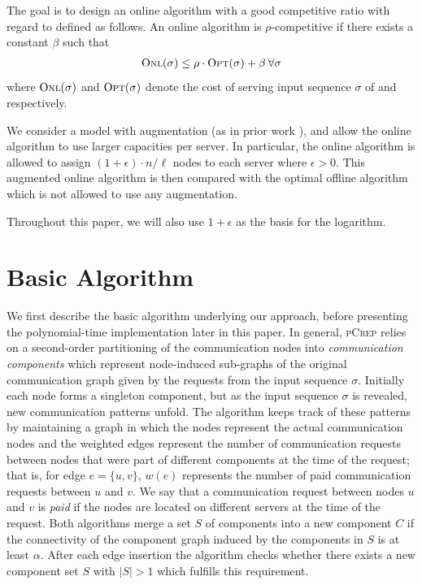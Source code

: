 \documentclass[a4paper,UKenglish,cleveref, autoref, thm-restate,authorcolumns]{lipics-v2019}
\newcommand{\adjDel}{\textsc{pCrep}}
\newcommand{\opt}{\text{O{\scriptsize PT}}}
\newcommand{\onl}{\text{O{\scriptsize NL}}}
\begin{document}
The goal is to design an online algorithm \onl{} with a good competitive ratio with regard to \opt{} defined as follows.
An online algorithm \onl{} is $\rho$-competitive if there exists a constant $\beta$ such that 
\begin{align*}
\onl{}(\sigma)\leq\rho\cdot \opt{}(\sigma)+\beta\:\forall \sigma
\end{align*} 
where $\onl{}(\sigma)$ and $\opt{}(\sigma)$ denote the cost of serving input sequence $\sigma$ of \onl{} and \opt{} respectively.

We consider a model with augmentation (as in prior work \cite{Avin2016}),
and allow the online algorithm to use larger capacities per server. 
In particular, the online algorithm is allowed to assign $(1+\epsilon)\cdot n/\ell$ nodes to each server where $\epsilon>0$. 
This augmented online algorithm is then compared with the optimal offline algorithm \opt{} which is not allowed to use any augmentation.

Throughout this paper, 
we will also use $1+\epsilon$ as the basis for the logarithm.

\section{Basic Algorithm}
\label{algIdeas}

We first describe the basic algorithm underlying
our approach, before presenting the polynomial-time implementation
later in this paper.
In general, \adjDel{} relies on a second-order partitioning of the communication nodes into \textit{communication components} which represent node-induced sub-graphs of the original communication graph given by the requests from the input sequence $\sigma$. 
Initially each node forms a singleton component, but as the input sequence $\sigma$ is revealed, new communication patterns unfold. The algorithm keeps track of these patterns by maintaining a graph in which the nodes represent the actual communication nodes and the weighted edges represent the number of communication requests between nodes that were part of different components at the time of the request; that is, 
for edge $e=\{u,v\}$, $w(e)$ represents the number of paid communication requests between $u$ and $v$. We say that a communication request between nodes $u$ and $v$ is \textit{paid} if the nodes are located on different servers at the time of the request.
Both algorithms merge a set $S$ of components into a new component $C$ if the connectivity of the component graph induced by the components in $S$ is at least $\alpha$. After each edge insertion the algorithm checks whether there exists a new component set $S$ with $|S|>1$ which fulfills this requirement.
\end{document}
